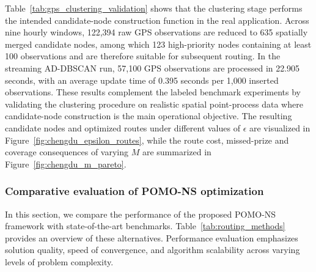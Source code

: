 \documentclass[preprint,12pt,authoryear]{elsarticle}
\theoremstyle{definition}
\begin{document}
\begin{table}[H]
\centering
\caption{Application-aligned spatial clustering validation on Chengdu GPS observations.}
\label{tab:gps_clustering_validation}
\begingroup
\small
\renewcommand{\arraystretch}{1.2}
\setlength{\tabcolsep}{4pt}
\endgroup
\end{table}

Table~\ref{tab:gps_clustering_validation} shows that the clustering stage performs the intended candidate-node construction function in the real application. Across nine hourly windows, 122,394 raw GPS observations are reduced to 635 spatially merged candidate nodes, among which 123 high-priority nodes containing at least 100 observations and are therefore suitable for subsequent routing. In the streaming AD-DBSCAN run, 57,100 GPS observations are processed in 22.905 seconds, with an average update time of 0.395 seconds per 1,000 inserted observations. These results complement the labeled benchmark experiments by validating the clustering procedure on realistic spatial point-process data where candidate-node construction is the main operational objective. The resulting candidate nodes and optimized routes under different values of $\epsilon$ are visualized in Figure~\ref{fig:chengdu_epsilon_routes}, while the route cost, missed-prize and coverage consequences of varying $M$ are summarized in Figure~\ref{fig:chengdu_m_pareto}.





\subsubsection{Comparative evaluation of POMO-NS optimization}

In this section, we compare the performance of the proposed POMO-NS framework with state-of-the-art benchmarks. Table~\ref{tab:routing_methods} provides an overview of these alternatives. Performance evaluation emphasizes solution quality, speed of convergence, and algorithm scalability across varying levels of problem complexity.
\end{document}
